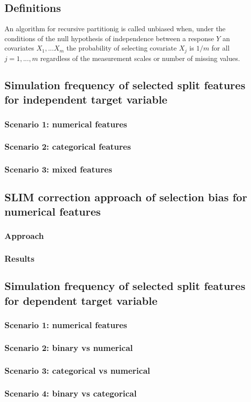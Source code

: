 \subsection{Definitions}

An algorithm for recursive partitionig is called unbiased when, under the conditions of the null hypothesis of independence between a response $Y$ an covariates $X_{1},...X_{m}$ the probability of selecting covariate $X_{j}$ is $1/m$ for all $j = 1,...,m$ regardless of the measurement scales or number of missing values. \citep{Hothorn.2006}

\subsection{Simulation frequency of selected split features for independent target variable}
\subsubsection{Scenario 1: numerical features}
\subsubsection{Scenario 2: categorical features}
\subsubsection{Scenario 3: mixed features}
\subsection{SLIM correction approach of selection bias for numerical features}
\subsubsection{Approach}
\subsubsection{Results}

\subsection{Simulation frequency of selected split features for dependent target variable}
\subsubsection{Scenario 1: numerical features}
\subsubsection{Scenario 2: binary vs numerical}
\subsubsection{Scenario 3: categorical vs  numerical}
\subsubsection{Scenario 4: binary vs  categorical}


